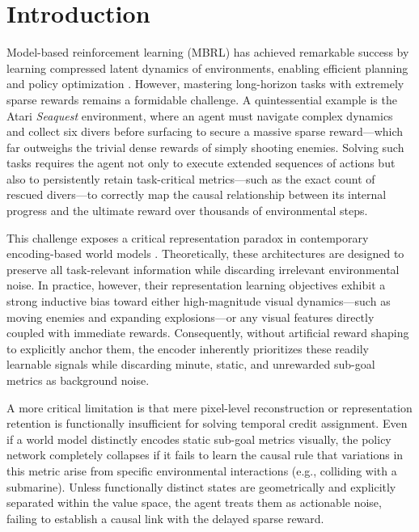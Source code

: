 \documentclass{article} %
\begin{document}
\section{Introduction}
Model-based reinforcement learning (MBRL) has achieved remarkable success by learning compressed latent dynamics of environments, enabling efficient planning and policy optimization \citep{hafner2025mastering}. However, mastering long-horizon tasks with extremely sparse rewards remains a formidable challenge. A quintessential example is the Atari \textit{Seaquest} environment, where an agent must navigate complex dynamics and collect six divers before surfacing to secure a massive sparse reward---which far outweighs the trivial dense rewards of simply shooting enemies. Solving such tasks requires the agent not only to execute extended sequences of actions but also to persistently retain task-critical metrics—such as the exact count of rescued divers—to correctly map the causal relationship between its internal progress and the ultimate reward over thousands of environmental steps.

This challenge exposes a critical representation paradox in contemporary encoding-based world models \citep[e.g.,][]{hafner2025mastering, zhang2023storm, wang2025drama, burchi2025learning}. Theoretically, these architectures are designed to preserve all task-relevant information while discarding irrelevant environmental noise. In practice, however, their representation learning objectives exhibit a strong inductive bias toward either high-magnitude visual dynamics---such as moving enemies and expanding explosions---or any visual features directly coupled with immediate rewards. Consequently, without artificial reward shaping to explicitly anchor them, the encoder inherently prioritizes these readily learnable signals while discarding minute, static, and unrewarded sub-goal metrics as background noise.

A more critical limitation is that mere pixel-level reconstruction or representation retention is functionally insufficient for solving temporal credit assignment. Even if a world model distinctly encodes static sub-goal metrics visually, the policy network completely collapses if it fails to learn the causal rule that variations in this metric arise from specific environmental interactions (e.g., colliding with a submarine). Unless functionally distinct states are geometrically and explicitly separated within the value space, the agent treats them as actionable noise, failing to establish a causal link with the delayed sparse reward.
\end{document}
